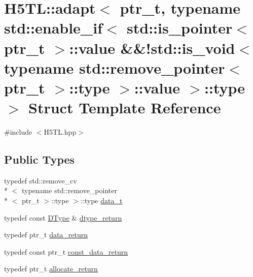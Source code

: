 \hypertarget{struct_h5_t_l_1_1adapt_3_01ptr__t_00_01typename_01std_1_1enable__if_3_01std_1_1is__pointer_3_01p0a19472823b7668f52349b1de2805cc9}{\section{H5\-T\-L\-:\-:adapt$<$ ptr\-\_\-t, typename std\-:\-:enable\-\_\-if$<$ std\-:\-:is\-\_\-pointer$<$ ptr\-\_\-t $>$\-:\-:value \&\&!std\-:\-:is\-\_\-void$<$ typename std\-:\-:remove\-\_\-pointer$<$ ptr\-\_\-t $>$\-:\-:type $>$\-:\-:value $>$\-:\-:type $>$ Struct Template Reference}
\label{struct_h5_t_l_1_1adapt_3_01ptr__t_00_01typename_01std_1_1enable__if_3_01std_1_1is__pointer_3_01p0a19472823b7668f52349b1de2805cc9}
}


{\ttfamily \#include $<$H5\-T\-L.\-hpp$>$}

\subsection*{Public Types}
\begin{DoxyCompactItemize}
\item 
typedef std\-::remove\-\_\-cv\\*
$<$ typename std\-::remove\-\_\-pointer\\*
$<$ ptr\-\_\-t $>$\-::type $>$\-::type \hyperlink{struct_h5_t_l_1_1adapt_3_01ptr__t_00_01typename_01std_1_1enable__if_3_01std_1_1is__pointer_3_01p0a19472823b7668f52349b1de2805cc9_a91409177e8577edea179d0779372a8da}{data\-\_\-t}
\item 
typedef const \hyperlink{class_h5_t_l_1_1_d_type}{D\-Type} \& \hyperlink{struct_h5_t_l_1_1adapt_3_01ptr__t_00_01typename_01std_1_1enable__if_3_01std_1_1is__pointer_3_01p0a19472823b7668f52349b1de2805cc9_a0a09c362e9e8b585de8b5c40dfa3d73a}{dtype\-\_\-return}
\item 
typedef ptr\-\_\-t \hyperlink{struct_h5_t_l_1_1adapt_3_01ptr__t_00_01typename_01std_1_1enable__if_3_01std_1_1is__pointer_3_01p0a19472823b7668f52349b1de2805cc9_a1052221284f4ee04110401b8405e30af}{data\-\_\-return}
\item 
typedef const ptr\-\_\-t \hyperlink{struct_h5_t_l_1_1adapt_3_01ptr__t_00_01typename_01std_1_1enable__if_3_01std_1_1is__pointer_3_01p0a19472823b7668f52349b1de2805cc9_af470da35473fd010e6b5be6c0853eb04}{const\-\_\-data\-\_\-return}
\item 
typedef ptr\-\_\-t \hyperlink{struct_h5_t_l_1_1adapt_3_01ptr__t_00_01typename_01std_1_1enable__if_3_01std_1_1is__pointer_3_01p0a19472823b7668f52349b1de2805cc9_acab459d2216e73f16832870692c45c66}{allocate\-\_\-return}
\end{DoxyCompactItemize}
